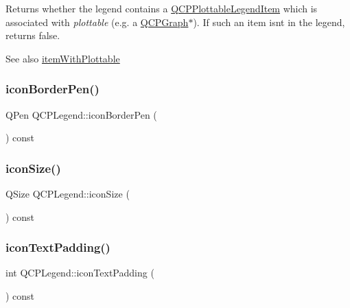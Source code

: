 Returns whether the legend contains a \mbox{\hyperlink{class_q_c_p_plottable_legend_item}{Q\+C\+P\+Plottable\+Legend\+Item}} which is associated with {\itshape plottable} (e.\+g. a \mbox{\hyperlink{class_q_c_p_graph}{Q\+C\+P\+Graph}}$\ast$). If such an item isn\textquotesingle{}t in the legend, returns false.

\begin{DoxySeeAlso}{See also}
\mbox{\hyperlink{class_q_c_p_legend_a91e790002d8bf15a20628a8e8841e397}{item\+With\+Plottable}} 
\end{DoxySeeAlso}
\mbox{\label{class_q_c_p_legend_a5b91d2ea68a4dd20238f660b80cd9945}} 
\subsubsection{\texorpdfstring{iconBorderPen()}{iconBorderPen()}}
{\footnotesize\ttfamily Q\+Pen Q\+C\+P\+Legend\+::icon\+Border\+Pen (\begin{DoxyParamCaption}{ }\end{DoxyParamCaption}) const\hspace{0.3cm}{\ttfamily [inline]}}

\mbox{\label{class_q_c_p_legend_ae4f17a186558c82d2ba269f6e7164dda}} 
\subsubsection{\texorpdfstring{iconSize()}{iconSize()}}
{\footnotesize\ttfamily Q\+Size Q\+C\+P\+Legend\+::icon\+Size (\begin{DoxyParamCaption}{ }\end{DoxyParamCaption}) const\hspace{0.3cm}{\ttfamily [inline]}}

\mbox{\label{class_q_c_p_legend_a19668bb7f8fafe20d367cebf96269eaf}} 
\subsubsection{\texorpdfstring{iconTextPadding()}{iconTextPadding()}}
{\footnotesize\ttfamily int Q\+C\+P\+Legend\+::icon\+Text\+Padding (\begin{DoxyParamCaption}{ }\end{DoxyParamCaption}) const\hspace{0.3cm}{\ttfamily [inline]}}

